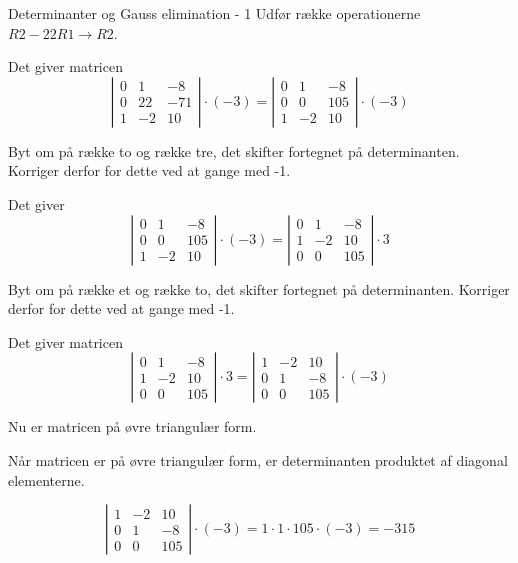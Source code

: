 \documentclass{article}
\begin{document}
\begin{exercise}{Determinanter og Gauss elimination - 1}
\hint
Udfør række operationerne
$R2 - 22R1 \to R2$.

\hint
Det giver matricen
\[
\left|\begin{array}{rrr}
0 & 1 & -8 \\ 
0 & 22 & -71 \\
1 & -2 & 10
\end{array} \right| \cdot (-3) = 
\left|\begin{array}{rrr}
0 & 1 & -8 \\ 
0 & 0 & 105 \\
1 & -2 & 10
\end{array} \right| \cdot (-3)
\]

\hint
Byt om på række to og række tre, det skifter fortegnet på determinanten.
Korriger derfor for dette ved at gange med -1.

\hint
Det giver 
\[
\left|\begin{array}{rrr}
0 & 1 & -8 \\ 
0 & 0 & 105 \\
1 & -2 & 10
\end{array} \right| \cdot (-3) = 
\left|\begin{array}{rrr}
0 & 1 & -8 \\ 
1 & -2 & 10 \\
0 & 0 & 105
\end{array} \right| \cdot 3
\]

\hint
Byt om på række et og række to, det skifter fortegnet på determinanten.
Korriger derfor for dette ved at gange med -1.

\hint
Det giver matricen
\[
\left|\begin{array}{rrr}
0 & 1 & -8 \\ 
1 & -2 & 10 \\
0 & 0 & 105
\end{array} \right| \cdot 3 = 
\left|\begin{array}{rrr}
1 & -2 & 10 \\
0 & 1 & -8 \\ 
0 & 0 & 105
\end{array} \right| \cdot (-3)
\]

\hint
Nu er matricen på øvre triangulær form.

\hint
Når matricen er på øvre triangulær form, er determinanten 
produktet af diagonal elementerne.

\hint
\[
\left|\begin{array}{rrr}
1 & -2 & 10 \\
0 & 1 & -8 \\ 
0 & 0 & 105
\end{array} \right| \cdot (-3)
= 1 \cdot 1 \cdot 105 \cdot (-3)
= -315
\]
	
\end{exercise}
\end{document}
